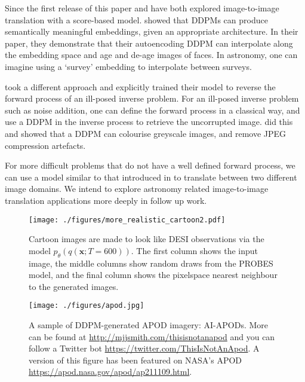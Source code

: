 \documentclass[fleqn,usenatbib]{mnras}
\begin{document}
Since the first release of this paper \citet{cite_preechakul2021} and
\citet{cite_saharia2021} have both explored image-to-image translation 
with a score-based model. \citet{cite_preechakul2021} showed that DDPMs 
can produce semantically meaningful embeddings, given an appropriate 
architecture. 
In their paper, they demonstrate that their autoencoding DDPM can 
interpolate along the embedding space and age and de-age images of faces. 
In astronomy, one can imagine using a `survey' embedding to interpolate 
between surveys.

\citet{cite_saharia2021} took a different approach and explicitly trained 
their model to reverse the forward process of an ill-posed inverse problem.   
For an ill-posed inverse problem such as noise addition, one can define 
the forward process in a classical way, and use a DDPM in the inverse 
process to retrieve the uncorrupted image.  
\citet{cite_saharia2021} did this and showed that a DDPM
can colourise greyscale images, and remove JPEG compression artefacts.  

For more difficult problems that do not have a well defined forward 
process, we can use a model similar to that introduced in \citet{cite_sasaki2021} 
to translate between two different image domains. We intend to explore astronomy
related image-to-image translation applications more deeply in follow up
work.

\begin{figure}
    \centering
    \texttt{[image: ./figures/more\_realistic\_cartoon2.pdf]}
    \caption{Cartoon images are made to look like DESI observations via
    the model $p_\theta(q(\mathbf{x}; T = 600))$. 
    The first column shows the input image, the middle columns show
    random draws from the PROBES model, and the final column shows
    the pixelspace nearest neighbour to the generated images.}
    \label{fig_transfer}
\end{figure}

\begin{figure*}     
  \texttt{[image: ./figures/apod.jpg]}
\caption{A sample of DDPM-generated APOD imagery: AI-APODs. More can be found
    at \url{http://mjjsmith.com/thisisnotanapod} and you can follow a Twitter
    bot \url{https://twitter.com/ThisIsNotAnApod}. A version of this figure has
    been featured on NASA's APOD
    \url{https://apod.nasa.gov/apod/ap211109.html}.}
    \label{fig_apod}
\end{figure*}
\end{document}
